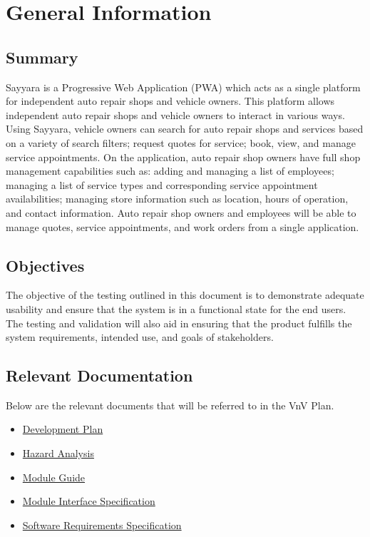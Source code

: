 \documentclass[12pt, titlepage]{article}
\begin{document}
\section{General Information}

\subsection{Summary}

Sayyara is a Progressive Web Application (PWA) which acts as a single platform for independent auto
repair shops and vehicle owners. This platform allows independent auto repair shops and vehicle
owners to interact in various ways. Using Sayyara, vehicle owners can search for auto repair shops
and services based on a variety of search filters; request quotes for service; book, view, and
manage service appointments. On the application, auto repair shop owners have full shop management
capabilities such as: adding and managing a list of employees; managing a list of service types and
corresponding service appointment availabilities; managing store information such as location,
hours of operation, and contact information. Auto repair shop owners and employees will be able to
manage quotes, service appointments, and work orders from a single application.

\subsection{Objectives}

The objective of the testing outlined in this document is to demonstrate adequate usability and
ensure that the system is in a functional state for the end users. The testing and validation will
also aid in ensuring that the product fulfills the system requirements, intended use, and goals of
stakeholders.

\subsection{Relevant Documentation}

Below are the relevant documents that will be referred to in the VnV Plan.

\begin{itemize}
	\item \href{https://github.com/arkinmodi/project-sayyara/blob/main/docs/DevelopmentPlan/DevelopmentPlan.pdf}{Development Plan \citep*{DevPlan}}
	\item \href{https://github.com/arkinmodi/project-sayyara/blob/main/docs/HazardAnalysis/HazardAnalysis.pdf}{Hazard Analysis \citep*{HA}}
	\item \href{https://github.com/arkinmodi/project-sayyara/blob/main/docs/Design/MG/MG.pdf}{Module Guide \citep*{MG}}
	\item \href{https://github.com/arkinmodi/project-sayyara/blob/main/docs/Design/MIS/MIS.pdf}{Module Interface Specification \citep*{MIS}}
	\item \href{https://github.com/arkinmodi/project-sayyara/blob/main/docs/SRS/SRS.pdf}{Software Requirements Specification \citep*{SRS}}
\end{itemize}
\end{document}
